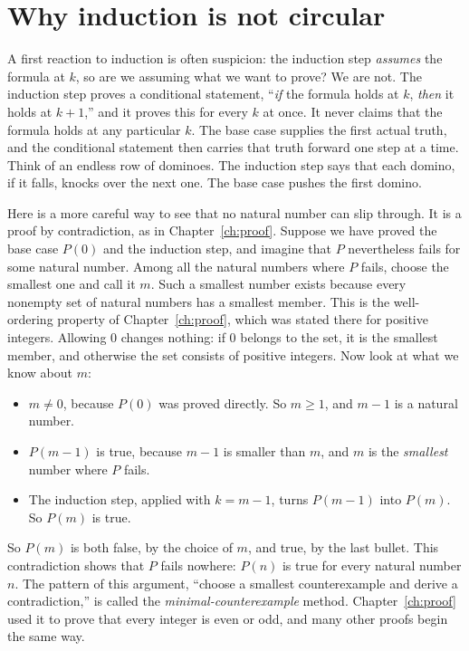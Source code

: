 \section{Why induction is not circular}\label{ch05:sec:not-circular}
A first reaction to induction is often suspicion: the induction step \emph{assumes} the formula at $k$, so are we assuming what we want to prove? We are not. The induction step proves a conditional statement, ``\emph{if} the formula holds at $k$, \emph{then} it holds at $k+1$,'' and it proves this for every $k$ at once. It never claims that the formula holds at any particular $k$. The base case supplies the first actual truth, and the conditional statement then carries that truth forward one step at a time. Think of an endless row of dominoes. The induction step says that each domino, if it falls, knocks over the next one. The base case pushes the first domino.

Here is a more careful way to see that no natural number can slip through. It is a proof by contradiction, as in Chapter~\ref{ch:proof}. Suppose we have proved the base case $P(0)$ and the induction step, and imagine that $P$ nevertheless fails for some natural number. Among all the natural numbers where $P$ fails, choose the smallest one and call it $m$. Such a smallest number exists because every nonempty set of natural numbers has a smallest member. This is the well-ordering property of Chapter~\ref{ch:proof}, which was stated there for positive integers. Allowing $0$ changes nothing: if $0$ belongs to the set, it is the smallest member, and otherwise the set consists of positive integers. Now look at what we know about $m$:
\begin{itemize}
\item $m\ne0$, because $P(0)$ was proved directly. So $m\ge1$, and $m-1$ is a natural number.
\item $P(m-1)$ is true, because $m-1$ is smaller than $m$, and $m$ is the \emph{smallest} number where $P$ fails.
\item The induction step, applied with $k=m-1$, turns $P(m-1)$ into $P(m)$. So $P(m)$ is true.
\end{itemize}
So $P(m)$ is both false, by the choice of $m$, and true, by the last bullet. This contradiction shows that $P$ fails nowhere: $P(n)$ is true for every natural number $n$. The pattern of this argument, ``choose a smallest counterexample and derive a contradiction,'' is called the \emph{minimal-counterexample} method. Chapter~\ref{ch:proof} used it to prove that every integer is even or odd, and many other proofs begin the same way.

